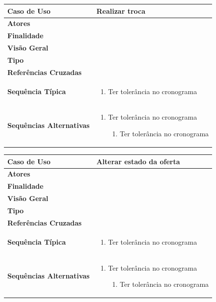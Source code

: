 \documentclass[a4paper,11pt]{article}
\begin{document}
\begin{table}[H]
		\begin{tabularx}{\textwidth}{|l|X|}
		\hline
			\textbf{Caso de Uso} &  Realizar troca \\ \hline
			\textbf{Atores} &    \\ \hline
			\textbf{Finalidade} &   \\ \hline
			\textbf{Visão Geral} &  \\ \hline
			\textbf{Tipo} &  \\ \hline
			\textbf{Referências Cruzadas} &  \\ \hline
			\textbf{Sequência Típica} & 
			\begin{enumerate}
			\item Ter tolerância no cronograma
			\end{enumerate} \\ \hline
			\textbf{Sequências Alternativas} & 
			\begin{enumerate}
			\item Ter tolerância no cronograma
			\begin{enumerate}
			\item Ter tolerância no cronograma
			\end{enumerate}
			\end{enumerate} \\ \hline
		\end{tabularx}
\end{table}

\begin{table}[H]
		\begin{tabularx}{\textwidth}{|l|X|}
		\hline
			\textbf{Caso de Uso} &  Alterar estado da oferta \\ \hline
			\textbf{Atores} &    \\ \hline
			\textbf{Finalidade} &   \\ \hline
			\textbf{Visão Geral} &  \\ \hline
			\textbf{Tipo} &  \\ \hline
			\textbf{Referências Cruzadas} &  \\ \hline
			\textbf{Sequência Típica} & 
			\begin{enumerate}
			\item Ter tolerância no cronograma
			\end{enumerate} \\ \hline
			\textbf{Sequências Alternativas} & 
			\begin{enumerate}
			\item Ter tolerância no cronograma
			\begin{enumerate}
			\item Ter tolerância no cronograma
			\end{enumerate}
			\end{enumerate} \\ \hline
		\end{tabularx}
\end{table}
\end{document}
